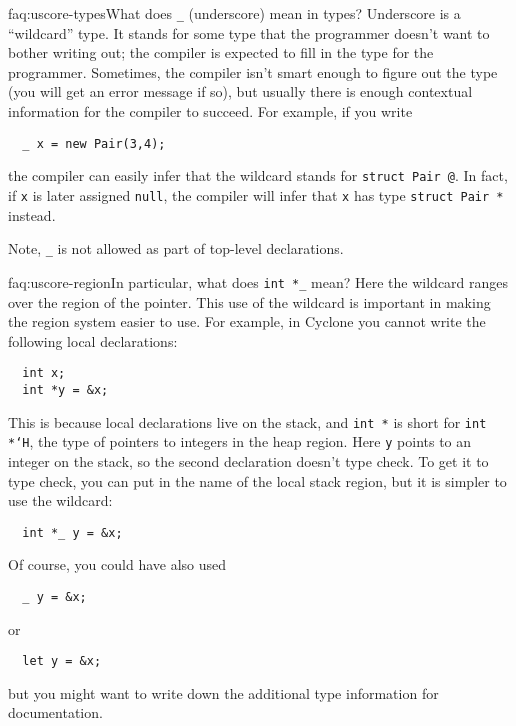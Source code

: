 \begin{faqa}{faq:uscore-types}{What does \texttt{_} (underscore) mean in types?}
Underscore is a ``wildcard'' type.  It stands for some type that the
programmer doesn't want to bother writing out; the compiler is
expected to fill in the type for the programmer.  Sometimes, the
compiler isn't smart enough to figure out the type (you will get an
error message if so), but usually there is enough contextual
information for the compiler to succeed.  For example, if you write
\begin{verbatim}
  _ x = new Pair(3,4);
\end{verbatim}
the compiler can easily infer that the wildcard stands for
\texttt{struct Pair @}.  In fact, if \texttt{x} is later assigned
\texttt{null}, the compiler will infer that \texttt{x} has type
\texttt{struct Pair *} instead.

Note, \texttt{_} is not allowed as part of top-level declarations.
\end{faqa}

\begin{faqa}{faq:uscore-region}{In particular, what does \texttt{int *_} mean?}
Here the wildcard ranges over the region of the pointer.  This use of
the wildcard is important in making the region system easier to use.
For example, in Cyclone you cannot write the following local declarations:
\begin{verbatim}
  int x;
  int *y = &x;
\end{verbatim}
This is because local declarations live on the stack, and \texttt{int
  *} is short for \texttt{int *`H}, the type of pointers to integers
in the heap region.  Here \texttt{y} points to an integer on the
stack, so the second declaration doesn't type check.  To get it to
type check, you can put in the name of the local stack region, but it
is simpler to use the wildcard:
\begin{verbatim}
  int *_ y = &x;
\end{verbatim}
Of course, you could have also used
\begin{verbatim}
  _ y = &x;
\end{verbatim}
or
\begin{verbatim}
  let y = &x;
\end{verbatim}
but you might want to write down the additional type information for
documentation.
\end{faqa}

